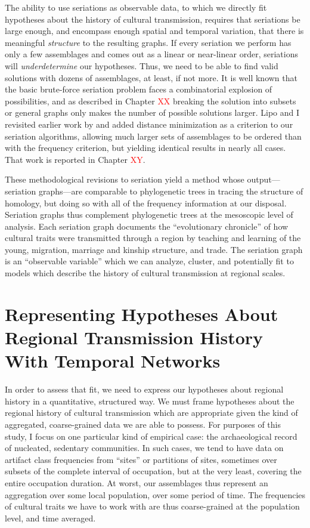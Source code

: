     The ability to use seriations as observable data, to which we directly fit hypotheses about the history of cultural transmission, requires that seriations be large enough, and encompass enough spatial and temporal variation, that there is meaningful \emph{structure} to the resulting graphs.  If every seriation we perform has only a few assemblages and comes out as a linear or near-linear order, seriations will \emph{underdetermine} our hypotheses.  Thus, we need to be able to find valid solutions with dozens of assemblages, at least, if not more.  It is well known that the basic brute-force seriation problem faces a combinatorial explosion of possibilities, and as described in Chapter \textcolor{red}{XX} breaking the solution into subsets or general graphs only makes the number of possible solutions larger.  Lipo and I revisited earlier work by \citep{Kadane1971} and added distance minimization as a criterion to our seriation algorithms, allowing much larger sets of assemblages to be ordered than with the frequency criterion, but yielding identical results in nearly all cases.  That work is reported in Chapter \textcolor{red}{XY}.  
    
    These methodological revisions to seriation yield a method whose output---seriation graphs---are comparable to phylogenetic trees in tracing the structure of homology, but doing so with all of the frequency information at our disposal.  Seriation graphs thus complement phylogenetic trees at the mesoscopic level of analysis.  Each seriation graph documents the ``evolutionary chronicle'' of how cultural traits were transmitted through a region by teaching and learning of the young, migration, marriage and kinship structure, and trade.  The seriation graph is an ``observable variable'' which we can analyze, cluster, and potentially fit to models which describe the history of cultural transmission at regional scales.
    
    
    
    \section{Representing Hypotheses About Regional Transmission History With Temporal Networks}\label{metapop:sec:temporal-networks}
    
    In order to assess that fit, we need to express our hypotheses about regional history in a quantitative, structured way.  
    We must frame hypotheses about the regional history of cultural transmission which are appropriate given the kind of aggregated, coarse-grained data we are able to possess.  For purposes of this study, I focus on one particular kind of empirical case:  the archaeological record of nucleated, sedentary communities.  In such cases, we tend to have data on artifact class frequencies from ``sites'' or partitions of sites, sometimes over subsets of the complete interval of occupation, but at the very least, covering the entire occupation duration.  At worst, our assemblages thus represent an aggregation over some local population, over some period of time.  The frequencies of cultural traits we have to work with are thus coarse-grained at the population level, and time averaged.  
    
